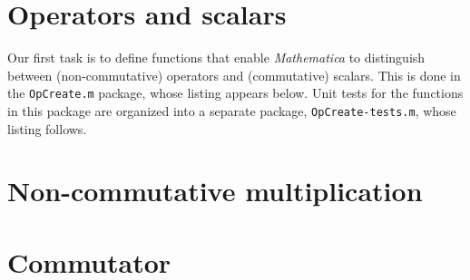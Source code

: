 \documentclass[12pt,letterpaper]{refart}
\begin{document}
%
%
%
%
%
%
%
%
%
%

\cite{Helton2015feb} \cite{Levitt2015mar}

\section{Operators and scalars}

Our first task is to define functions that enable \emph{Mathematica} to distinguish between (non-commutative) operators and (commutative) scalars.  This is done in the \verb+OpCreate.m+ package, whose listing appears below.  Unit tests for the functions in this package are organized into a separate package, \verb+OpCreate-tests.m+, whose listing follows. 




\section{Non-commutative multiplication}




\section{Commutator}





\clearpage

\renewcommand*{\bibfont}{\raggedright\normalfont\small}

\end{document}
